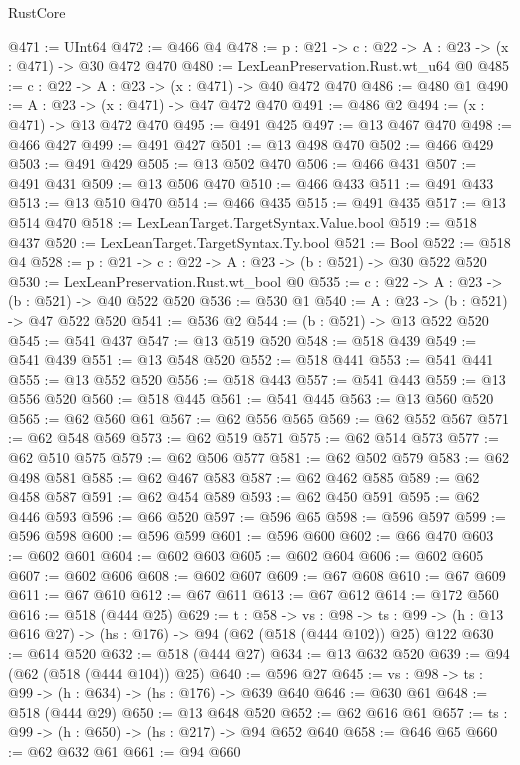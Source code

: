 \begin{lexlean}{RustCore}
\begin{coremodule}
@471 := UInt64
@472 := @466 @4
@478 := {p : @21} -> {c : @22} -> {A : @23} -> (x : @471) -> @30 @472 @470
@480 := LexLeanPreservation.Rust.wt_u64 @0
@485 := {c : @22} -> {A : @23} -> (x : @471) -> @40 @472 @470
@486 := @480 @1
@490 := {A : @23} -> (x : @471) -> @47 @472 @470
@491 := @486 @2
@494 := (x : @471) -> @13 @472 @470
@495 := @491 @425
@497 := @13 @467 @470
@498 := @466 @427
@499 := @491 @427
@501 := @13 @498 @470
@502 := @466 @429
@503 := @491 @429
@505 := @13 @502 @470
@506 := @466 @431
@507 := @491 @431
@509 := @13 @506 @470
@510 := @466 @433
@511 := @491 @433
@513 := @13 @510 @470
@514 := @466 @435
@515 := @491 @435
@517 := @13 @514 @470
@518 := LexLeanTarget.TargetSyntax.Value.bool
@519 := @518 @437
@520 := LexLeanTarget.TargetSyntax.Ty.bool
@521 := Bool
@522 := @518 @4
@528 := {p : @21} -> {c : @22} -> {A : @23} -> (b : @521) -> @30 @522 @520
@530 := LexLeanPreservation.Rust.wt_bool @0
@535 := {c : @22} -> {A : @23} -> (b : @521) -> @40 @522 @520
@536 := @530 @1
@540 := {A : @23} -> (b : @521) -> @47 @522 @520
@541 := @536 @2
@544 := (b : @521) -> @13 @522 @520
@545 := @541 @437
@547 := @13 @519 @520
@548 := @518 @439
@549 := @541 @439
@551 := @13 @548 @520
@552 := @518 @441
@553 := @541 @441
@555 := @13 @552 @520
@556 := @518 @443
@557 := @541 @443
@559 := @13 @556 @520
@560 := @518 @445
@561 := @541 @445
@563 := @13 @560 @520
@565 := @62 @560 @61
@567 := @62 @556 @565
@569 := @62 @552 @567
@571 := @62 @548 @569
@573 := @62 @519 @571
@575 := @62 @514 @573
@577 := @62 @510 @575
@579 := @62 @506 @577
@581 := @62 @502 @579
@583 := @62 @498 @581
@585 := @62 @467 @583
@587 := @62 @462 @585
@589 := @62 @458 @587
@591 := @62 @454 @589
@593 := @62 @450 @591
@595 := @62 @446 @593
@596 := @66 @520
@597 := @596 @65
@598 := @596 @597
@599 := @596 @598
@600 := @596 @599
@601 := @596 @600
@602 := @66 @470
@603 := @602 @601
@604 := @602 @603
@605 := @602 @604
@606 := @602 @605
@607 := @602 @606
@608 := @602 @607
@609 := @67 @608
@610 := @67 @609
@611 := @67 @610
@612 := @67 @611
@613 := @67 @612
@614 := @172 @560
@616 := @518 (@444 @25)
@629 := {t : @58} ->
  {vs : @98} ->
  {ts : @99} -> (h : @13 @616 @27) -> (hs : @176) -> @94 (@62 (@518 (@444 @102)) @25) @122
@630 := @614 @520
@632 := @518 (@444 @27)
@634 := @13 @632 @520
@639 := @94 (@62 (@518 (@444 @104)) @25)
@640 := @596 @27
@645 := {vs : @98} -> {ts : @99} -> (h : @634) -> (hs : @176) -> @639 @640
@646 := @630 @61
@648 := @518 (@444 @29)
@650 := @13 @648 @520
@652 := @62 @616 @61
@657 := {ts : @99} -> (h : @650) -> (hs : @217) -> @94 @652 @640
@658 := @646 @65
@660 := @62 @632 @61
@661 := @94 @660

\end{coremodule}
\end{lexlean}
